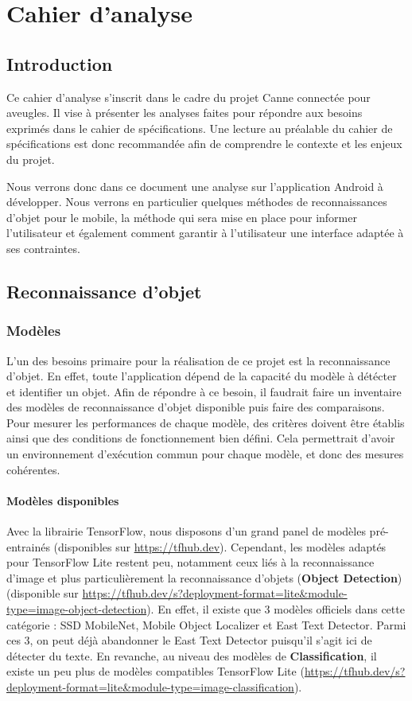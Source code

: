\documentclass[UTF8]{EPURapport}
\begin{document}
\chapter{Cahier d'analyse}

\section{Introduction}
Ce cahier d'analyse s'inscrit dans le cadre du projet Canne connectée pour aveugles. Il vise à présenter les analyses faites pour répondre aux besoins exprimés dans le cahier de spécifications. Une lecture au préalable du cahier de spécifications est donc recommandée afin de comprendre le contexte et les enjeux du projet.

Nous verrons donc dans ce document une analyse sur l'application Android à développer. Nous verrons en particulier quelques méthodes de reconnaissances d'objet pour le mobile, la méthode qui sera mise en place pour informer l'utilisateur et également comment garantir à l'utilisateur une interface adaptée à ses contraintes.

\section{Reconnaissance d'objet}
\subsection{Modèles}
L'un des besoins primaire pour la réalisation de ce projet est la reconnaissance d'objet. En effet, toute l’application dépend de la capacité du modèle à détécter et identifier un objet. Afin de répondre à ce besoin, il faudrait faire un inventaire des modèles de reconnaissance d'objet disponible puis faire des comparaisons. Pour mesurer les performances de chaque modèle, des critères doivent être établis ainsi que des conditions de fonctionnement bien défini. Cela permettrait d'avoir un environnement d'exécution commun pour chaque modèle, et donc des mesures cohérentes.

\subsubsection{Modèles disponibles}
Avec la librairie TensorFlow, nous disposons d'un grand panel de modèles pré-entrainés (disponibles sur \url{https://tfhub.dev}). Cependant, les modèles adaptés pour TensorFlow Lite restent peu, notamment ceux liés à la reconnaissance d'image et plus particulièrement la reconnaissance d'objets (\textbf{Object Detection}) (disponible sur \url{https://tfhub.dev/s?deployment-format=lite&module-type=image-object-detection}). En effet, il existe que 3 modèles officiels dans cette catégorie : SSD MobileNet, Mobile Object Localizer et East Text Detector. Parmi ces 3, on peut déjà abandonner le East Text Detector puisqu'il s'agit ici de détecter du texte. En revanche, au niveau des modèles de \textbf{Classification}, il existe un peu plus de modèles compatibles TensorFlow Lite (\url{https://tfhub.dev/s?deployment-format=lite&module-type=image-classification}).
\end{document}
